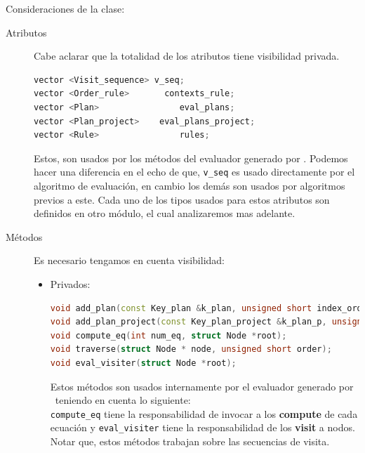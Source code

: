 Consideraciones de la clase:

\begin{description}
\item [Atributos] Cabe aclarar que la totalidad de los atributos tiene visibilidad privada.

\vspace{0.3cm}
\begin{lstlisting}[basicstyle=\scriptsize, backgroundcolor=\color{white}, language=c++, columns=fullflexible, linewidth=7cm]
vector <Visit_sequence> v_seq;
vector <Order_rule>       contexts_rule;
vector <Plan>                eval_plans;
vector <Plan_project>    eval_plans_project;
vector <Rule>                rules;
\end{lstlisting}
\vspace{0.3cm}

Estos, son usados por los métodos del evaluador generado por \maggen. Podemos hacer una diferencia en el echo de que, \texttt{v\_seq} es usado directamente por el algoritmo de evaluación, en cambio los demás son usados por algoritmos previos a este. Cada uno de los tipos usados para estos atributos son definidos en otro módulo, el cual analizaremos mas adelante.

\item [Métodos] Es necesario tengamos en cuenta visibilidad:

\begin{itemize}
\item Privados:

\vspace{0.3cm}
\begin{lstlisting}[basicstyle=\scriptsize, backgroundcolor=\color{white}, language=c++, columns=fullflexible, linewidth=13cm]
void add_plan(const Key_plan &k_plan, unsigned short index_order);
void add_plan_project(const Key_plan_project &k_plan_p, unsigned short index_order);
void compute_eq(int num_eq, struct Node *root);
void traverse(struct Node * node, unsigned short order);
void eval_visiter(struct Node *root);
\end{lstlisting}
\vspace{0.3cm}

Estos métodos son usados internamente por el evaluador generado por \maggen\ teniendo en cuenta lo siguiente:\\
\texttt{compute\_eq} tiene la responsabilidad de invocar a los \textbf{compute} de cada ecuación y \texttt{eval\_visiter} tiene la responsabilidad de los \textbf{visit} a nodos. Notar que, estos métodos trabajan sobre las secuencias de visita.


\end{itemize}
\end{description}
